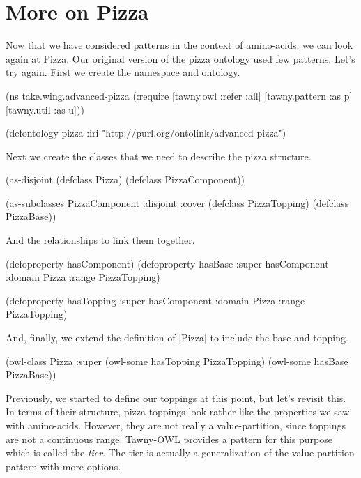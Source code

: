
\chapter{More on Pizza}
\label{cha:more-pizza}

Now that we have considered patterns in the context of amino-acids, we
can look again at Pizza. Our original version of the pizza ontology
used few patterns. Let's try again. First we create the namespace and
ontology.

\begin{tawny}
(ns take.wing.advanced-pizza
  (:require [tawny.owl :refer :all]
            [tawny.pattern :as p]
            [tawny.util :as u]))

(defontology pizza
  :iri "http://purl.org/ontolink/advanced-pizza")
\end{tawny}

Next we create the classes that we need to describe the pizza
structure.

\begin{tawny}
(as-disjoint
 (defclass Pizza)
 (defclass PizzaComponent))

(as-subclasses
 PizzaComponent
 :disjoint :cover
 (defclass PizzaTopping)
 (defclass PizzaBase))
\end{tawny}

And the relationships to link them together.

\begin{tawny}
(defoproperty hasComponent)
(defoproperty hasBase
  :super hasComponent
  :domain Pizza
  :range PizzaTopping)

(defoproperty hasTopping
  :super hasComponent
  :domain Pizza
  :range PizzaTopping)
\end{tawny}

And, finally, we extend the definition of |Pizza| to include the base
and topping.

\begin{tawny}
(owl-class Pizza
  :super (owl-some hasTopping PizzaTopping)
         (owl-some hasBase PizzaBase))
\end{tawny}

Previously, we started to define our toppings at this point, but let's
revisit this. In terms of their structure, pizza toppings look rather
like the properties we saw with amino-acids. However, they are not
really a value-partition, since toppings are not a continuous
range. Tawny-OWL provides a pattern for this purpose which is called
the \emph{tier}. The tier is actually a generalization of the value
partition pattern with more options.

